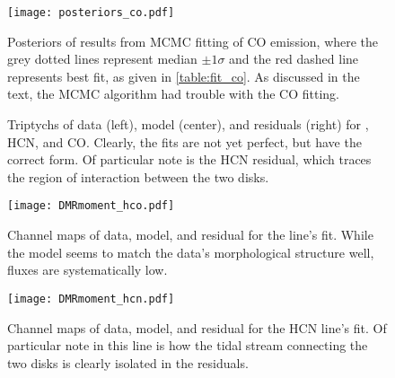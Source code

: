 \begin{figure}%
  \hspace*{\fill}%
  \texttt{[image: posteriors\_co.pdf]}\hfill%
  \hspace*{\fill}%
  \caption{Posteriors of results from MCMC fitting of CO emission, where the grey dotted lines represent median $\pm 1\sigma$ and the red dashed line represents best fit, as given in \ref{table:fit_co}. As discussed in the text, the MCMC algorithm had trouble with the CO fitting.}
  \label{fig:co_posteriors}
\end{figure}





\begin{figure}%
  \centering
    \hspace*{\fill}%
    \vfill%
    \vfill%
    \hspace*{\fill}%
    \caption{Triptychs of data (left), model (center), and residuals (right) for \hco, HCN, and CO. Clearly, the fits are not yet perfect, but have the correct form. Of particular note is the HCN residual, which traces the region of interaction between the two disks.}
    \label{fig:dmr_moment_maps}
\end{figure}









\begin{figure}%
  \hspace*{\fill}%
  \texttt{[image: DMRmoment\_hco.pdf]}\hfill%
  \hspace*{\fill}%
  \caption{Channel maps of data, model, and residual for the \hco line's fit. While the model seems to match the data's morphological structure well, fluxes are systematically low.}
  \label{fig:hco_chanmaps}
\end{figure}



\begin{figure}%
  \hspace*{\fill}%
  \texttt{[image: DMRmoment\_hcn.pdf]}\hfill%
  \hspace*{\fill}%
  \caption{Channel maps of data, model, and residual for the HCN line's fit. Of particular note in this line is how the tidal stream connecting the two disks is clearly isolated in the residuals.}
  \label{fig:hcn_chanmaps}
\end{figure}




